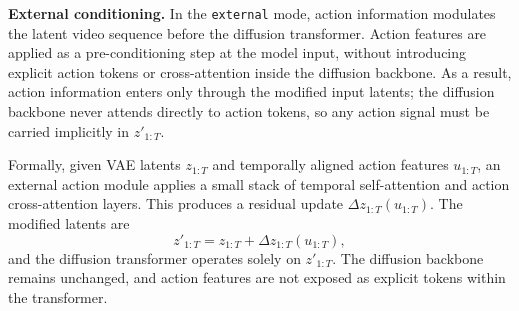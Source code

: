 \noindent\textbf{External conditioning.}
In the \texttt{external} mode, action information modulates the latent video sequence before the diffusion transformer.
Action features are applied as a pre-conditioning step at the model input, without introducing explicit action tokens or cross-attention inside the diffusion backbone.
As a result, action information enters only through the modified input latents; the diffusion backbone never attends directly to action tokens, so any action signal must be carried implicitly in $z'_{1:T}$.

Formally, given VAE latents $z_{1:T}$ and temporally aligned action features $u_{1:T}$, an external action module applies a small stack of temporal self-attention and action cross-attention layers.
This produces a residual update $\Delta z_{1:T}(u_{1:T})$.
The modified latents are
\[
  z'_{1:T} = z_{1:T} + \Delta z_{1:T}(u_{1:T}),
\]
and the diffusion transformer operates solely on $z'_{1:T}$.
The diffusion backbone remains unchanged, and action features are not exposed as explicit tokens within the transformer.

